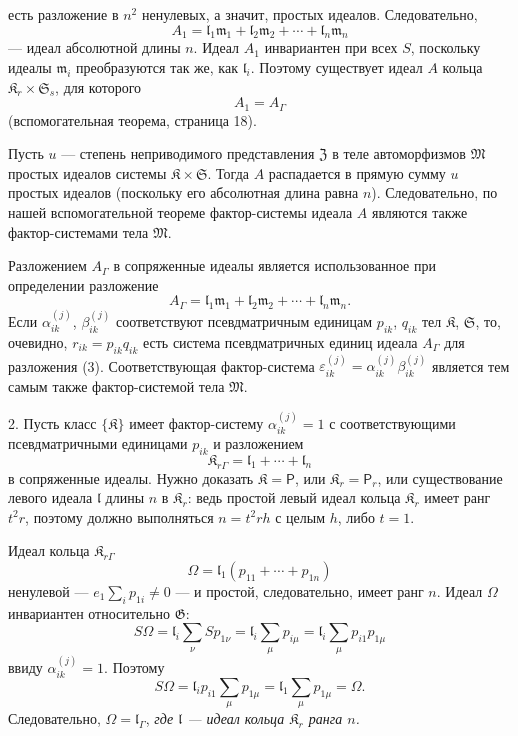 \documentclass[11pt]{article}
\begin{document}
есть разложение в \(n^2\) ненулевых, а значит, простых идеалов. Следовательно,
\[
A_1=\mathfrak l_1\mathfrak m_1+\mathfrak l_2\mathfrak m_2+\cdots+\mathfrak l_n\mathfrak m_n
\]
--- идеал абсолютной длины \(n\). Идеал \(A_1\) инвариантен при всех \(S\), поскольку идеалы \(\mathfrak m_i\) преобразуются так же, как \(\mathfrak l_i\). Поэтому существует идеал \(A\) кольца \(\mathfrak K_r\times\mathfrak S_s\), для которого
\[
A_1=A_\Gamma
\]
(вспомогательная теорема, страница 18).

Пусть \(u\) --- степень неприводимого представления \(\mathfrak Z\) в теле автоморфизмов \(\mathfrak M\) простых идеалов системы \(\mathfrak K\times\mathfrak S\). Тогда \(A\) распадается в прямую сумму \(u\) простых идеалов (поскольку его абсолютная длина равна \(n\)). Следовательно, по нашей вспомогательной теореме фактор-системы идеала \(A\) являются также фактор-системами тела \(\mathfrak M\).

Разложением \(A_\Gamma\) в сопряженные идеалы является использованное при определении разложение
\[
\tag{3}
A_\Gamma=\mathfrak l_1\mathfrak m_1+\mathfrak l_2\mathfrak m_2+\cdots+\mathfrak l_n\mathfrak m_n.
\]
Если \(\alpha_{ik}^{(j)}\), \(\beta_{ik}^{(j)}\) соответствуют псевдматричным единицам \(p_{ik}\), \(q_{ik}\) тел \(\mathfrak K\), \(\mathfrak S\), то, очевидно, \(r_{ik}=p_{ik}q_{ik}\) есть система псевдматричных единиц идеала \(A_\Gamma\) для разложения (3). Соответствующая фактор-система \(\varepsilon_{ik}^{(j)}=\alpha_{ik}^{(j)}\beta_{ik}^{(j)}\) является тем самым также фактор-системой тела \(\mathfrak M\).

2. Пусть класс \(\{\mathfrak K\}\) имеет фактор-систему \(\alpha_{ik}^{(j)}=1\) с соответствующими псевдматричными единицами \(p_{ik}\) и разложением
\[
\mathfrak K_{r\Gamma}=\mathfrak l_1+\cdots+\mathfrak l_n
\]
в сопряженные идеалы. Нужно доказать \(\mathfrak K=\mathsf P\), или \(\mathfrak K_r=\mathsf P_r\), или существование левого идеала \(\mathfrak l\) длины \(n\) в \(\mathfrak K_r\): ведь простой левый идеал кольца \(\mathfrak K_r\) имеет ранг \(t^2r\), поэтому должно выполняться \(n=t^2rh\) с целым \(h\), либо \(t=1\).

Идеал кольца \(\mathfrak K_{r\Gamma}\)
\[
\Omega=\mathfrak l_1(p_{11}+\cdots+p_{1n})
\]
ненулевой --- \(e_1\sum_i p_{1i}\ne0\) --- и простой, следовательно, имеет ранг \(n\). Идеал \(\Omega\) инвариантен относительно \(\mathfrak G\):
\[
S\Omega
=\mathfrak l_i\sum_\nu S p_{1\nu}
=\mathfrak l_i\sum_\mu p_{i\mu}
=\mathfrak l_i\sum_\mu p_{i1}p_{1\mu}
\]
ввиду \(\alpha_{ik}^{(j)}=1\). Поэтому
\[
S\Omega=\mathfrak l_ip_{i1}\sum_\mu p_{1\mu}
=\mathfrak l_1\sum_\mu p_{1\mu}
=\Omega.
\]
Следовательно, \(\Omega=\mathfrak l_\Gamma\), \emph{где \(\mathfrak l\) --- идеал кольца \(\mathfrak K_r\) ранга \(n\).}
\end{document}
